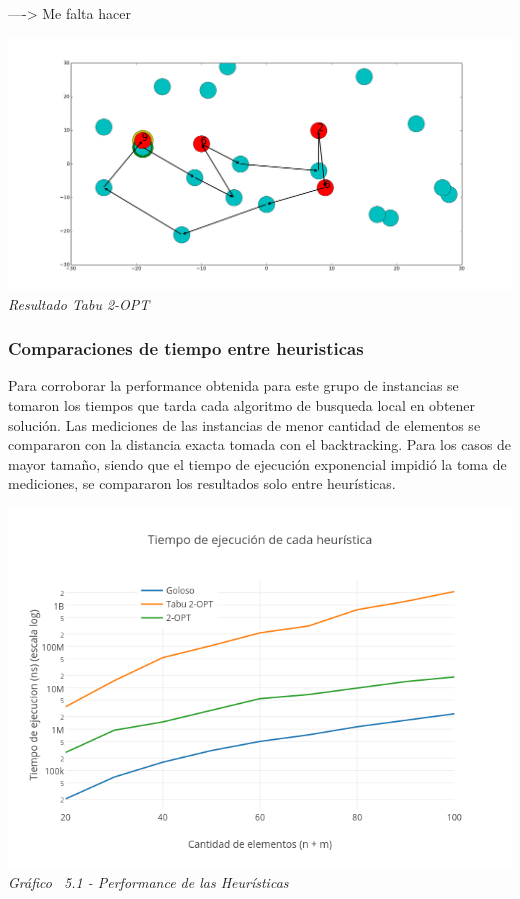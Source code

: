    ----> Me falta hacer
    \vspace*{0.3cm} \vspace*{0.3cm}
  \begin{center}
\includegraphics[scale=0.3]{./EJ5/caminoEj3opt.png}
\\{\textit{Resultado Tabu 2-OPT}}
  \end{center}
  \vspace*{0.3cm}


\subsubsection{Comparaciones de tiempo entre heuristicas}

Para corroborar la performance obtenida para este grupo de instancias se tomaron los tiempos que tarda cada algoritmo de busqueda local en obtener soluci\'on. 
 Las mediciones de las instancias de menor cantidad de elementos se compararon con la distancia exacta tomada con el backtracking. Para los casos de mayor tamaño, siendo que el tiempo de ejecución exponencial impidió la toma de mediciones, se compararon los resultados solo entre heurísticas.


\vspace*{0.3cm} \vspace*{0.3cm}
  \begin{center}
 \includegraphics[scale=0.5]{./EJ5/medicion.png}\\
 {\textit{Gráfico \ 5.1 - Performance de las Heur\'isticas}}
  \end{center}
  \vspace*{0.3cm}


